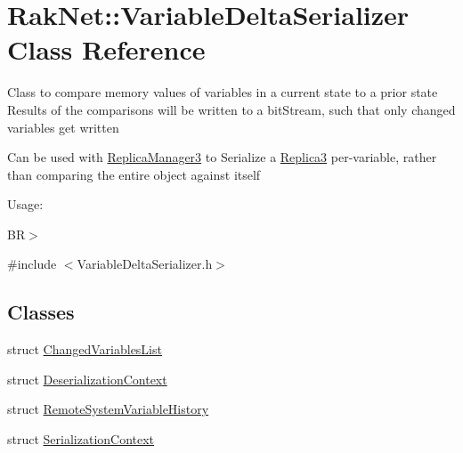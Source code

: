 \hypertarget{class_rak_net_1_1_variable_delta_serializer}{\section{Rak\-Net\-:\-:Variable\-Delta\-Serializer Class Reference}
\label{class_rak_net_1_1_variable_delta_serializer}
}


Class to compare memory values of variables in a current state to a prior state Results of the comparisons will be written to a bit\-Stream, such that only changed variables get written\par
 Can be used with \hyperlink{class_rak_net_1_1_replica_manager3}{Replica\-Manager3} to Serialize a \hyperlink{class_rak_net_1_1_replica3}{Replica3} per-\/variable, rather than comparing the entire object against itself\par
 Usage\-:\par
 B\-R$>$  




{\ttfamily \#include $<$Variable\-Delta\-Serializer.\-h$>$}

\subsection*{Classes}
\begin{DoxyCompactItemize}
\item 
struct \hyperlink{struct_rak_net_1_1_variable_delta_serializer_1_1_changed_variables_list}{Changed\-Variables\-List}
\item 
struct \hyperlink{struct_rak_net_1_1_variable_delta_serializer_1_1_deserialization_context}{Deserialization\-Context}
\item 
struct \hyperlink{struct_rak_net_1_1_variable_delta_serializer_1_1_remote_system_variable_history}{Remote\-System\-Variable\-History}
\item 
struct \hyperlink{struct_rak_net_1_1_variable_delta_serializer_1_1_serialization_context}{Serialization\-Context}
\end{DoxyCompactItemize}
